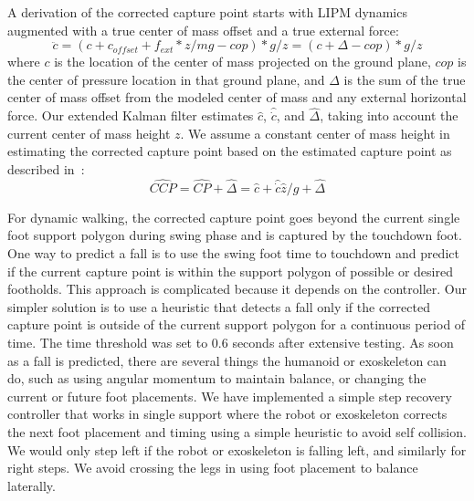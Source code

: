 \documentclass[letterpaper,12pt,fullpage]{article}
\begin{document}
A derivation of the corrected capture point starts with LIPM dynamics
augmented with a true center of mass offset and a true external force:
\begin{equation}
\ddot{c} = (c + c_{offset} + f_{ext}*z/mg - cop)*g/z
= (c + \Delta - cop)*g/z
\end{equation}
where $c$ is the location of the center of mass projected on the ground
plane,
$cop$ is the center of pressure
location in that ground plane, and $\Delta$ is the sum of the true center of mass
offset from the modeled center of mass and any external horizontal force.
Our extended Kalman filter estimates $\hat{c}$, $\hat{\dot{c}}$, and
$\hat{\Delta}$,
taking into account the
current center of mass height $z$. We assume a constant center of mass height
in estimating the corrected capture point based on the estimated capture point
as described in~\cite{capture}:
\begin{equation}
\widehat{CCP} = \widehat{CP} + \hat{\Delta} 
= \hat{c} + \hat{\dot{c}}\hat{z}/g + \hat{\Delta}
\end{equation}

For dynamic walking, the corrected capture point goes beyond the
current single foot support polygon during swing phase and is captured by
the touchdown foot. One way to predict a fall is to use the
swing foot time to touchdown and predict if the current
capture point is within the support polygon of possible or desired
footholds. This approach is complicated because it depends
on the controller. Our simpler solution is to use a heuristic
that detects a fall only if the corrected capture point
is outside of the current support
polygon for a continuous period of time. The time threshold was set to
0.6 seconds after extensive testing. As soon as a fall is
predicted, there are several things the humanoid or exoskeleton can do, such
as using angular momentum to maintain balance, or changing the
current or future foot placements.
We have implemented a simple
step recovery controller that works in single support where
the robot or exoskeleton corrects the next foot placement and timing
using a simple heuristic to avoid self collision.
We would only step left if the robot or exoskeleton is falling left, and similarly
for right steps. We avoid crossing the legs in using foot placement
to balance laterally.
\end{document}
